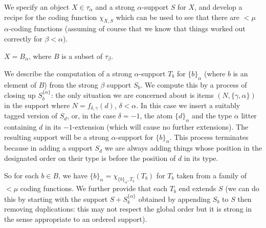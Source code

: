 \documentclass[112pt]{article}
\begin{document}
\begin{description}
We specify an object $X\in \tau_\alpha$ and a strong $\alpha$-support $S$ for $X$, and develop a recipe for the coding function $\chi_{X,S}$ which can be used to see that there are $<\mu$ $\alpha$-coding functions (assuming of course that we know that things worked out correctly for $\beta<\alpha$).

$X = B_\alpha$, where $B$ is a subset of $\tau_\beta$.  

We describe the computation of a strong $\alpha$-support $T_b$
for $\{b\}_\alpha$ (where $b$ is an element of $B$) from the strong $\beta$ support $S_b$.   We compute this by a process of closing up $S_b^{\{\alpha\}}$:  the only situation we are concerned
about is items $(N,\{\gamma,\alpha\})$ in the support where $N=f_{\delta,\gamma}(d)$, $\delta<\alpha$.  In this case we insert a suitably
tagged version of $S_d$, or, in the case $\delta= -1$, the atom $\{d\}_\alpha$ and the type $\alpha$ litter containing $d$ in its $-1$-extension (which will cause no further extensions).   The resulting support will be a strong $\alpha$-support for $\{b\}_\alpha$.  This process terminates because in adding a support $S_d$ we are always adding things whose position in the designated order on their type is before the position of $d$ in its type.

So for each $b \in B$, we have $\{b\}_\alpha = \chi_{\{b\}_\alpha,T_b}(T_b)$ for $T_b$ taken from a family of $<\mu$ coding functions.
We further provide that each $T_b$ end extends $S$ (we can do this by starting with the support $S+S_b^{\{\alpha\}}$ obtained by appending $S_b$ to $S$ then removing duplications: this may not respect the global order but it is strong in the sense appropriate to an ordered support).


\end{description}
\end{document}

